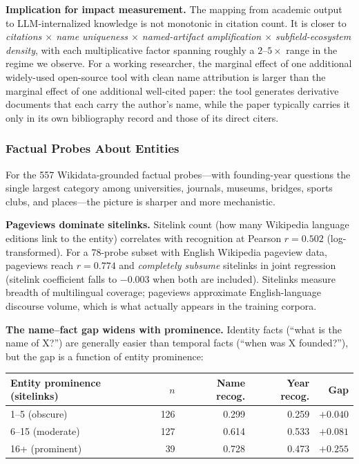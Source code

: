 \documentclass[11pt]{article}
\begin{document}
\textbf{Implication for impact measurement.} The mapping from academic output to LLM-internalized knowledge is not monotonic in citation count. It is closer to \emph{citations $\times$ name uniqueness $\times$ named-artifact amplification $\times$ subfield-ecosystem density}, with each multiplicative factor spanning roughly a $2$--$5\times$ range in the regime we observe. For a working researcher, the marginal effect of one additional widely-used open-source tool with clean name attribution is larger than the marginal effect of one additional well-cited paper: the tool generates derivative documents that each carry the author's name, while the paper typically carries it only in its own bibliography record and those of its direct citers.

\subsubsection{Factual Probes About Entities}
\label{sec:recognition-wikidata}

For the 557 Wikidata-grounded factual probes---with founding-year questions the single largest category among universities, journals, museums, bridges, sports clubs, and places---the picture is sharper and more mechanistic.

\textbf{Pageviews dominate sitelinks.} Sitelink count (how many Wikipedia language editions link to the entity) correlates with recognition at Pearson $r = 0.502$ (log-transformed). For a 78-probe subset with English Wikipedia pageview data, pageviews reach $r = 0.774$ and \emph{completely subsume} sitelinks in joint regression (sitelink coefficient falls to $-0.003$ when both are included). Sitelinks measure breadth of multilingual coverage; pageviews approximate English-language discourse volume, which is what actually appears in the training corpora.

\textbf{The name--fact gap widens with prominence.} Identity facts (``what is the name of X?'') are generally easier than temporal facts (``when was X founded?''), but the gap is a function of entity prominence:

\begin{center}
\begin{tabular}{lrrrr}
\toprule
Entity prominence (sitelinks) & $n$ & Name recog. & Year recog. & Gap \\
\midrule
1--5 (obscure)     & 126 & 0.299 & 0.259 & $+0.040$ \\
6--15 (moderate)   & 127 & 0.614 & 0.533 & $+0.081$ \\
16+ (prominent)    & \phantom{0}39 & 0.728 & 0.473 & $+0.255$ \\
\bottomrule
\end{tabular}
\end{center}
\end{document}
